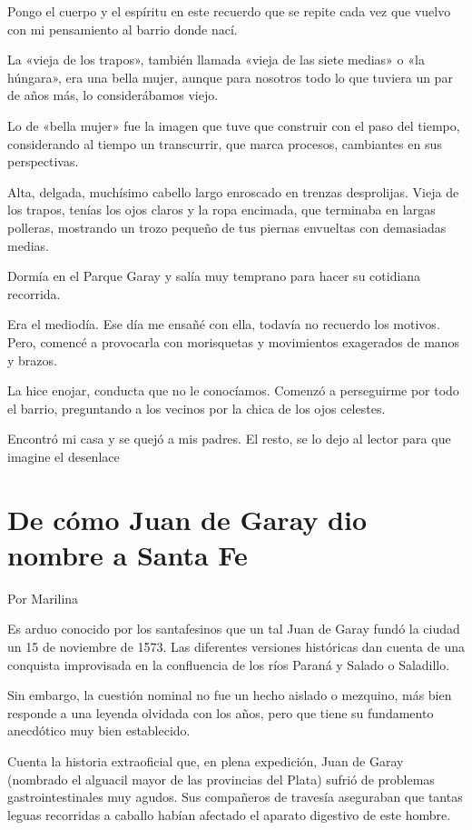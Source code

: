 \documentclass[11pt,twoside,openright,a5paper]{book}
\begin{document}
Pongo el cuerpo y el espíritu en este recuerdo que se repite cada vez que vuelvo con mi pensamiento al barrio donde nací.

La «vieja de los trapos», también llamada «vieja de las siete medias» o «la húngara», era una bella mujer, aunque para nosotros todo lo que tuviera un par de años más, lo considerábamos viejo.

Lo de «bella  mujer» fue la imagen que tuve que construir con el paso del tiempo, considerando al tiempo un transcurrir, que marca procesos, cambiantes en sus perspectivas.

Alta, delgada, muchísimo cabello largo enroscado en trenzas desprolijas. Vieja de los trapos, tenías los ojos claros y la ropa encimada, que terminaba en largas polleras, mostrando un trozo pequeño de tus piernas envueltas con demasiadas medias.

Dormía en el Parque Garay y salía muy temprano para hacer su cotidiana recorrida.

Era el mediodía. Ese día me ensañé con ella, todavía no recuerdo los motivos. Pero, comencé a provocarla con morisquetas y movimientos exagerados de manos y brazos.

La hice enojar, conducta que no le conocíamos. Comenzó a perseguirme por todo el barrio, preguntando a los vecinos por la chica de los ojos celestes.

Encontró mi casa y se quejó a mis padres. El resto, se lo dejo al lector para que imagine el desenlace

\section*{De cómo Juan de Garay dio nombre a Santa Fe}

                                          \begin{flushright}Por Marilina\end{flushright}

Es arduo conocido por los santafesinos que un tal Juan de Garay fundó la ciudad un 15 de noviembre de 1573. Las diferentes versiones históricas dan cuenta de una conquista improvisada en la confluencia de los ríos Paraná y Salado o Saladillo.

Sin embargo, la cuestión nominal no fue un hecho aislado o mezquino, más bien responde a una leyenda olvidada con los años, pero que tiene su fundamento anecdótico muy bien establecido.

Cuenta la historia extraoficial que, en plena expedición, Juan de Garay (nombrado el alguacil mayor de las provincias del Plata) sufrió de problemas gastrointestinales muy agudos. Sus compañeros de travesía aseguraban que tantas leguas recorridas a caballo habían afectado el aparato digestivo de este hombre.
\end{document}
